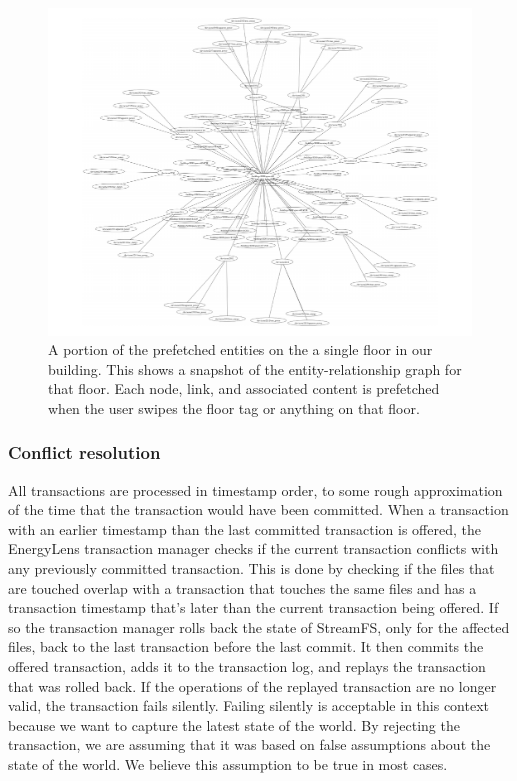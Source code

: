 \begin{figure}[htb!]
\begin{center}
\includegraphics[scale=0.55]{figs/SDH_4F_ERG_closeup}
\caption{A portion of the prefetched entities on the a single floor in our building.  This shows a snapshot of the entity-relationship
graph for that floor.  Each node, link, and associated content is prefetched when the user swipes the floor
tag or anything on that floor.}
\label{fig:sdh_4f_erg}
\end{center}
\end{figure}

\subsubsection{Conflict resolution}
All transactions are processed in timestamp order, to some rough approximation of the time that the transaction would have been committed.  When a transaction with an earlier timestamp than the last committed transaction is offered, the EnergyLens transaction manager checks if the current transaction conflicts with any previously committed transaction.  This is done by checking if the files that are touched overlap with a transaction that touches the same files and has a transaction timestamp that’s later than the current transaction being offered.  If so the transaction manager rolls back the state of StreamFS, only for the affected files, back to the last transaction before the last commit.  It then commits the offered transaction, adds it to the transaction log, and replays the transaction that was rolled back.  If the operations of the replayed transaction are no longer valid, the transaction fails silently.  Failing silently is acceptable in this context because we want to capture the latest state of the world.  By rejecting the transaction, we are assuming that it was based on false assumptions about the state of the world.  We believe this assumption to be true in most cases.


